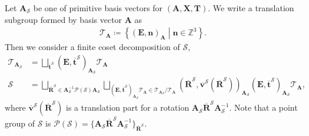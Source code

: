 \documentclass[a4paper, 11pt]{article}
\theoremstyle{definition}
\newcommand{\relmiddle}[1]{\mathrel{}\middle#1\mathrel{}}
\newcommand{\set}[2]{\left\{ #1 \relmiddle| #2 \right\}}
\begin{document}
Let $\bm{A}_{\mathcal{S}}$ be one of primitive basis vectors for $(\bm{A}, \bm{X}, \bm{T})$.
We write a translation subgroup formed by basis vector $\bm{A}$ as
\begin{align}
  \mathcal{T}_{\bm{A}} \coloneqq \set{ (\bm{E}, \bm{n})_{\bm{A}} }{ \bm{n} \in \mathbb{Z}^{3} }.
\end{align}
Then we consider a finite coset decomposition of $\mathcal{S}$,
\begin{align}
  \mathcal{T}_{\bm{A}_{\mathcal{S}}}
    &= \bigsqcup_{ \overline{ \bm{t} }^{\mathcal{S}} }
      \left( \bm{E}, \overline{ \bm{t} }^{\mathcal{S}} \right)_{ \bm{A}_{\mathcal{S}} }
      \mathcal{T}_{\bm{A}} \\
  \mathcal{S}
    &= \bigsqcup_{
          \overline{\bm{R}}^{\mathcal{S}} \in \bm{A}_{\mathcal{S}}^{-1} \mathcal{P}(\mathcal{S}) \bm{A}_{\mathcal{S}}
      }
      \bigsqcup_{
          \left( \bm{E}, \overline{ \bm{t} }^{\mathcal{S}} \right)_{ \bm{A}_{\mathcal{S}} } \mathcal{T}_{\bm{A}}
          \in \mathcal{T}_{\bm{A}_{\mathcal{S}}} / \mathcal{T}_{\bm{A}}
      }
      \left(
        \overline{\bm{R}}^{\mathcal{S}},
        \overline{ \bm{v} }^{\mathcal{S}}(\overline{\bm{R}}^{\mathcal{S}})
      \right)_{ \bm{A}_{\mathcal{S}} }
      \left( \bm{E}, \overline{ \bm{t} }^{\mathcal{S}} \right)_{ \bm{A}_{\mathcal{S}} }
      \mathcal{T}_{\bm{A}},
\end{align}
where $\overline{ \bm{v} }^{\mathcal{S}}(\overline{\bm{R}}^{\mathcal{S}})$ is a translation part for a rotation $\bm{A}_{\mathcal{S}} \overline{\bm{R}}^{\mathcal{S}} \bm{A}_{\mathcal{S}}^{-1}$.
Note that a point group of $\mathcal{S}$ is $\mathcal{P}(\mathcal{S}) = \{ \bm{A}_{\mathcal{S}} \overline{\bm{R}}^{\mathcal{S}} \bm{A}_{\mathcal{S}}^{-1} \}_{ \overline{\bm{R}}^{\mathcal{S}} }$.
\end{document}

